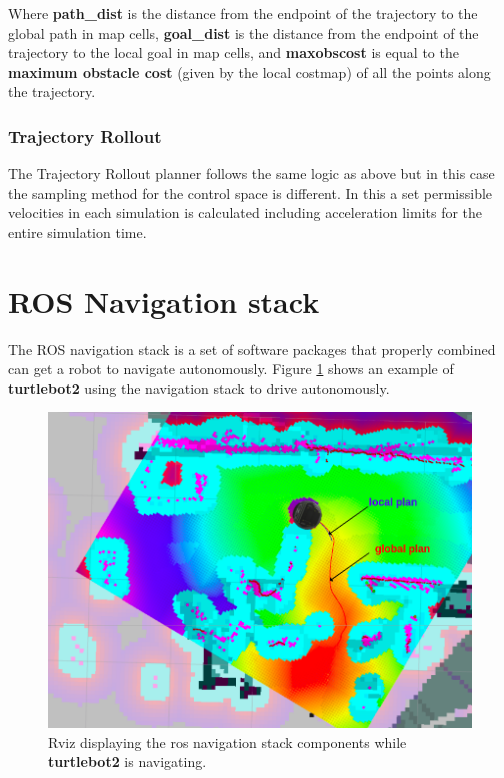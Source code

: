 \begin{itemize}
    Where \textbf{path\_dist} is the distance from the endpoint of the trajectory to the global path in map cells, \textbf{goal\_dist} is the distance from the endpoint of the trajectory to the local goal in map cells, and \textbf{maxobscost} is equal to the \textbf{maximum obstacle cost} (given by the local costmap) of all the points along the trajectory.
    \end{itemize}
\subsubsection{Trajectory Rollout}
The Trajectory Rollout planner follows the same logic as above but in this case the sampling method for the control space is different. In this a set permissible velocities
in each simulation is calculated including acceleration limits for the entire simulation
time\cite{inbookdwa}.
\section {ROS Navigation stack}
The ROS navigation stack is a set of software packages that properly combined can get a robot to navigate autonomously.
Figure \ref{fig:plans} shows an example of \textbf{turtlebot2} using the navigation stack to drive autonomously.
\begin{figure}[!htb]
    \centering
    \includegraphics[width=\linewidth]{imgs/chapter3/nav.png}
    \caption{Rviz displaying the ros navigation stack components while \textbf{turtlebot2} is navigating.}
    \label{fig:plans}
\end{figure}

